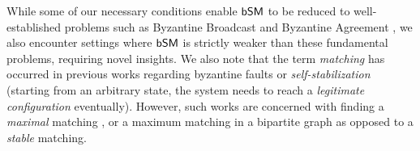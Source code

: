 While some of our necessary conditions enable $\textsf{bSM}$ to be reduced to well-established problems such as Byzantine Broadcast and Byzantine Agreement \cite{LSP82}, we also encounter settings where $\textsf{bSM}$ is strictly weaker than these fundamental problems, requiring novel insights.
We also note that the term \emph{matching} has occurred in previous works regarding byzantine faults or \emph{self-stabilization} (starting from an arbitrary state, the system needs to reach a \emph{legitimate configuration} eventually). However, such works are concerned with finding a \emph{maximal} matching \cite{HSU199277, ChHiSe02, MaMjPi07}, or a maximum matching in a bipartite graph \cite{HaKa09} as opposed to a \emph{stable} matching.
